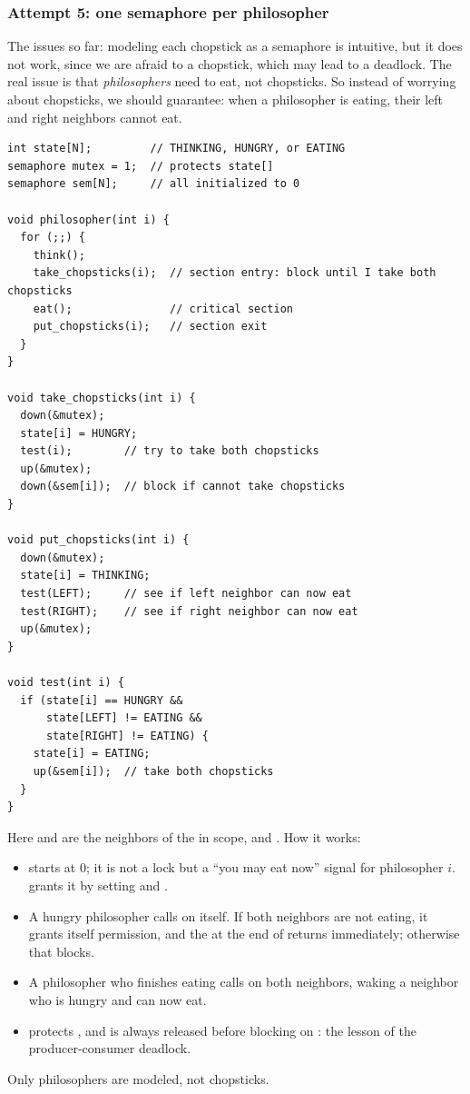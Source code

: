\subsubsection{Attempt 5: one semaphore per philosopher}
The issues so far: modeling each chopstick as a semaphore is intuitive, but it does not work, since we are afraid to  a chopstick, which may lead to a deadlock. The real issue is that \emph{philosophers} need to eat, not chopsticks. So instead of worrying about chopsticks, we should guarantee: when a philosopher is eating, their left and right neighbors cannot eat.
\begin{lstlisting}
int state[N];         // THINKING, HUNGRY, or EATING
semaphore mutex = 1;  // protects state[]
semaphore sem[N];     // all initialized to 0

void philosopher(int i) {
  for (;;) {
    think();
    take_chopsticks(i);  // section entry: block until I take both chopsticks
    eat();               // critical section
    put_chopsticks(i);   // section exit
  }
}

void take_chopsticks(int i) {
  down(&mutex);
  state[i] = HUNGRY;
  test(i);        // try to take both chopsticks
  up(&mutex);
  down(&sem[i]);  // block if cannot take chopsticks
}

void put_chopsticks(int i) {
  down(&mutex);
  state[i] = THINKING;
  test(LEFT);     // see if left neighbor can now eat
  test(RIGHT);    // see if right neighbor can now eat
  up(&mutex);
}

void test(int i) {
  if (state[i] == HUNGRY &&
      state[LEFT] != EATING &&
      state[RIGHT] != EATING) {
    state[i] = EATING;
    up(&sem[i]);  // take both chopsticks
  }
}
\end{lstlisting}
Here  and  are the neighbors of the  in scope,  and . How it works:
\begin{itemize}
  \item {} starts at $0$; it is not a lock but a ``you may eat now'' signal for philosopher $i$.  grants it by setting  and .
  \item A hungry philosopher calls  on itself. If both neighbors are not eating, it grants itself permission, and the  at the end of  returns immediately; otherwise that  blocks.
  \item A philosopher who finishes eating calls  on both neighbors, waking a neighbor who is hungry and can now eat.
  \item {} protects , and is always released before blocking on : the lesson of the producer-consumer deadlock.
\end{itemize}
Only philosophers are modeled, not chopsticks.

